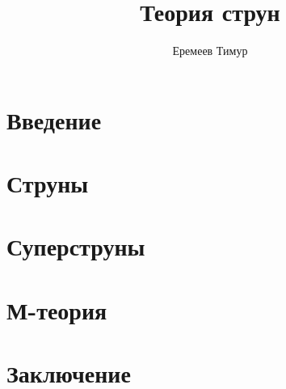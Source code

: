 \documentclass[a4paper 12pt]{article}
\title{Теория струн}
\author{Еремеев Тимур}
\begin{document}
    \maketitle

    \section*{Введение}
    

    \section*{Струны}
    

    \section*{Суперструны}
    

    \section*{М-теория}
    

    \section*{Заключение}
    
    
\end{document}
